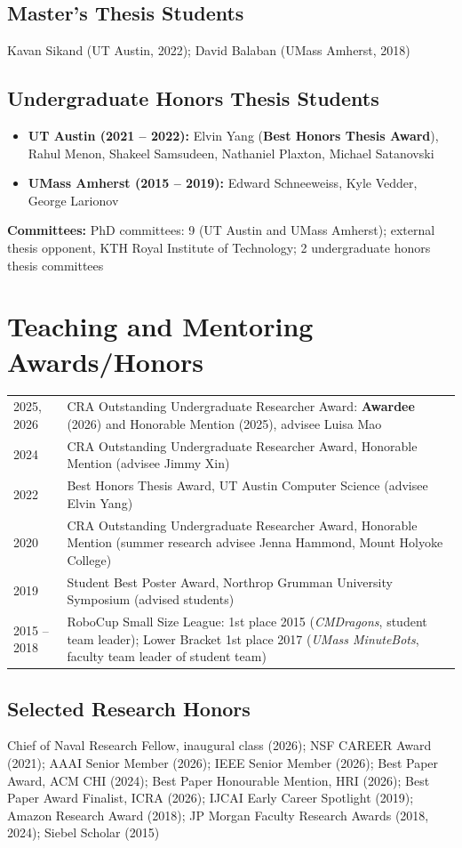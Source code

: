 \documentclass[Times]{article}
\begin{document}
\subsection*{Master's Thesis Students}
Kavan Sikand (UT Austin, 2022); David Balaban (UMass Amherst, 2018)

\subsection*{Undergraduate Honors Thesis Students}
\begin{itemize}
  \item \textbf{UT Austin (2021 -- 2022):} Elvin Yang (\textbf{Best Honors Thesis Award}), Rahul Menon,
  Shakeel Samsudeen, Nathaniel Plaxton, Michael Satanovski
  \item \textbf{UMass Amherst (2015 -- 2019):} Edward Schneeweiss, Kyle Vedder, George Larionov
\end{itemize}

\textbf{Committees:} PhD committees: 9 (UT Austin and UMass Amherst); external thesis opponent, KTH Royal Institute of
Technology; 2 undergraduate honors thesis committees

\section*{Teaching and Mentoring Awards/Honors}
\begin{tabular}{@{}p{2cm} >{\raggedright\arraybackslash}p{\dimexpr\textwidth-2cm-2\tabcolsep\relax}@{}}
  2025, 2026 & CRA Outstanding Undergraduate Researcher Award: \textbf{Awardee} (2026) and Honorable Mention (2025), advisee Luisa Mao \\
  2024 & CRA Outstanding Undergraduate Researcher Award, Honorable Mention (advisee Jimmy Xin) \\
  2022 & Best Honors Thesis Award, UT Austin Computer Science (advisee Elvin Yang) \\
  2020 & CRA Outstanding Undergraduate Researcher Award, Honorable Mention (summer research advisee Jenna Hammond, Mount Holyoke College) \\
  2019 & Student Best Poster Award, Northrop Grumman University Symposium (advised students) \\
  2015 -- 2018 & RoboCup Small Size League: 1st place 2015 (\emph{CMDragons}, student team leader);
  Lower Bracket 1st place 2017 (\emph{UMass MinuteBots}, faculty team leader of student team) \\
\end{tabular}

\subsection*{Selected Research Honors}
Chief of Naval Research Fellow, inaugural class (2026);
NSF CAREER Award (2021);
AAAI Senior Member (2026); IEEE Senior Member (2026);
Best Paper Award, ACM CHI (2024);
Best Paper Honourable Mention, HRI (2026);
Best Paper Award Finalist, ICRA (2026);
IJCAI Early Career Spotlight (2019);
Amazon Research Award (2018); JP Morgan Faculty Research Awards (2018, 2024);
Siebel Scholar (2015)
\end{document}
